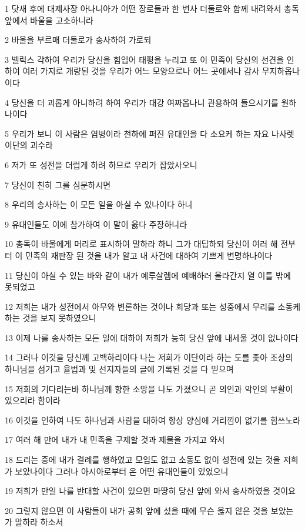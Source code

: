 \par 1 닷새 후에 대제사장 아나니아가 어떤 장로들과 한 변사 더둘로와 함께 내려와서 총독 앞에서 바울을 고소하니라
\par 2 바울을 부르매 더둘로가 송사하여 가로되
\par 3 벨릭스 각하여 우리가 당신을 힘입어 태평을 누리고 또 이 민족이 당신의 선견을 인하여 여러 가지로 개량된 것을 우리가 어느 모양으로나 어느 곳에서나 감사 무지하옵나이다
\par 4 당신을 더 괴롭게 아니하려 하여 우리가 대강 여짜옵나니 관용하여 들으시기를 원하나이다
\par 5 우리가 보니 이 사람은 염병이라 천하에 퍼진 유대인을 다 소요케 하는 자요 나사렛 이단의 괴수라
\par 6 저가 또 성전을 더럽게 하려 하므로 우리가 잡았사오니
\par 7 당신이 친히 그를 심문하시면
\par 8 우리의 송사하는 이 모든 일을 아실 수 있나이다 하니
\par 9 유대인들도 이에 참가하여 이 말이 옳다 주장하니라
\par 10 총독이 바울에게 머리로 표시하여 말하라 하니 그가 대답하되 당신이 여러 해 전부터 이 민족의 재판장 된 것을 내가 알고 내 사건에 대하여 기쁘게 변명하나이다
\par 11 당신이 아실 수 있는 바와 같이 내가 예루살렘에 예배하러 올라간지 열 이틀 밖에 못되었고
\par 12 저희는 내가 성전에서 아무와 변론하는 것이나 회당과 또는 성중에서 무리를 소동케 하는 것을 보지 못하였으니
\par 13 이제 나를 송사하는 모든 일에 대하여 저희가 능히 당신 앞에 내세울 것이 없나이다
\par 14 그러나 이것을 당신께 고백하리이다 나는 저희가 이단이라 하는 도를 좇아 조상의 하나님을 섬기고 율법과 및 선지자들의 글에 기록된 것을 다 믿으며
\par 15 저희의 기다리는바 하나님께 향한 소망을 나도 가졌으니 곧 의인과 악인의 부활이 있으리라 함이라
\par 16 이것을 인하여 나도 하나님과 사람을 대하여 항상 양심에 거리낌이 없기를 힘쓰노라
\par 17 여러 해 만에 내가 내 민족을 구제할 것과 제물을 가지고 와서
\par 18 드리는 중에 내가 결례를 행하였고 모임도 없고 소동도 없이 성전에 있는 것을 저희가 보았나이다 그러나 아시아로부터 온 어떤 유대인들이 있었으니
\par 19 저희가 만일 나를 반대할 사건이 있으면 마땅히 당신 앞에 와서 송사하였을 것이요
\par 20 그렇지 않으면 이 사람들이 내가 공회 앞에 섰을 때에 무슨 옳지 않은 것을 보았는가 말하라 하소서
